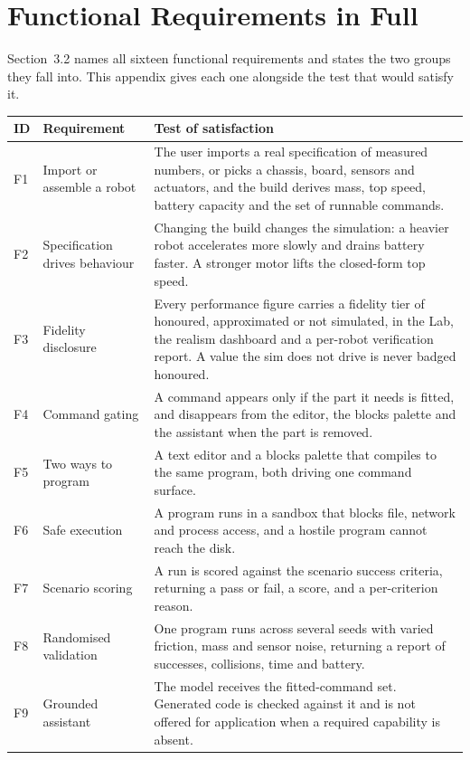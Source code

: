 \documentclass[11pt,a4paper]{report}
\begin{document}
\chapter{Functional Requirements in Full}
\label{app:requirements}
Section~3.2 names all sixteen functional requirements and states the two groups they fall into. This appendix gives each one alongside the test that would satisfy it.

\begin{table}[h]
\centering\footnotesize
\renewcommand{\arraystretch}{1.1}
\begin{tabular}{p{1.2cm}p{4.6cm}p{8.2cm}}
\toprule
ID & Requirement & Test of satisfaction \\
\midrule
F1 & Import or assemble a robot & The user imports a real specification of measured numbers, or picks a chassis, board, sensors and actuators, and the build derives mass, top speed, battery capacity and the set of runnable commands. \\
F2 & Specification drives behaviour & Changing the build changes the simulation: a heavier robot accelerates more slowly and drains battery faster. A stronger motor lifts the closed-form top speed. \\
F3 & Fidelity disclosure & Every performance figure carries a fidelity tier of honoured, approximated or not simulated, in the Lab, the realism dashboard and a per-robot verification report. A value the sim does not drive is never badged honoured. \\
F4 & Command gating & A command appears only if the part it needs is fitted, and disappears from the editor, the blocks palette and the assistant when the part is removed. \\
F5 & Two ways to program & A text editor and a blocks palette that compiles to the same program, both driving one command surface. \\
F6 & Safe execution & A program runs in a sandbox that blocks file, network and process access, and a hostile program cannot reach the disk. \\
F7 & Scenario scoring & A run is scored against the scenario success criteria, returning a pass or fail, a score, and a per-criterion reason. \\
F8 & Randomised validation & One program runs across several seeds with varied friction, mass and sensor noise, returning a report of successes, collisions, time and battery. \\
F9 & Grounded assistant & The model receives the fitted-command set. Generated code is checked against it and is not offered for application when a required capability is absent. \\

\end{tabular}
\end{table}
\end{document}
